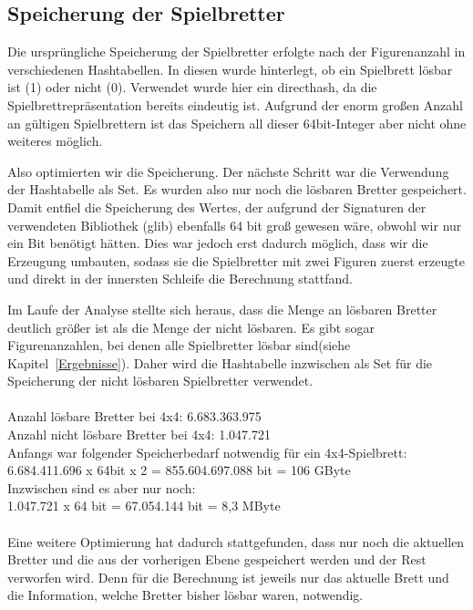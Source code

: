 \documentclass[
	12pt,
	a4paper,
	BCOR10mm,
	DIV14,
	listof=totoc,
	bibliography=totoc,
	headsepline
]{scrreprt}
\begin{document}
\subsection{Speicherung der Spielbretter}

Die ursprüngliche Speicherung der Spielbretter erfolgte nach der Figurenanzahl in verschiedenen Hashtabellen.
In diesen wurde hinterlegt, ob ein Spielbrett lösbar ist (1) oder nicht (0). Verwendet wurde hier ein directhash, da die Spielbrettrepräsentation bereits eindeutig ist.
Aufgrund der enorm großen Anzahl an gültigen Spielbrettern ist das Speichern all dieser 64bit-Integer aber nicht ohne weiteres möglich.

Also optimierten wir die Speicherung. Der nächste Schritt war die Verwendung der Hashtabelle als Set.  
Es wurden also nur noch die lösbaren Bretter gespeichert. Damit entfiel die Speicherung des Wertes, der aufgrund der Signaturen der verwendeten Bibliothek (glib) ebenfalls 64 bit groß gewesen wäre, obwohl wir nur ein Bit benötigt hätten.
Dies war jedoch erst dadurch möglich, dass wir die Erzeugung umbauten, sodass sie die Spielbretter mit zwei Figuren zuerst erzeugte und direkt in der innersten Schleife die Berechnung stattfand.

Im Laufe der Analyse stellte sich heraus, dass die Menge an lösbaren Bretter deutlich größer ist als die Menge der nicht lösbaren. Es gibt sogar Figurenanzahlen, bei denen alle Spielbretter lösbar sind(siehe Kapitel~\ref{Ergebnisse}).
Daher wird die Hashtabelle inzwischen als Set für die Speicherung der nicht lösbaren Spielbretter verwendet.\\
\\
Anzahl lösbare Bretter bei 4x4: 6.683.363.975\\
Anzahl nicht lösbare Bretter bei 4x4: 1.047.721\\

Anfangs war folgender Speicherbedarf notwendig für ein 4x4-Spielbrett:\\
6.684.411.696 x 64bit x 2 = 855.604.697.088 bit = 106 GByte \\
Inzwischen sind es aber nur noch: \\
1.047.721 x 64 bit = 67.054.144 bit = 8,3 MByte\\
\\ 
Eine weitere Optimierung hat dadurch stattgefunden, dass nur noch die aktuellen Bretter und die aus der vorherigen Ebene gespeichert werden und der Rest verworfen wird. Denn für die Berechnung ist jeweils nur das aktuelle Brett und die Information, welche Bretter bisher lösbar waren, notwendig.
\end{document}

